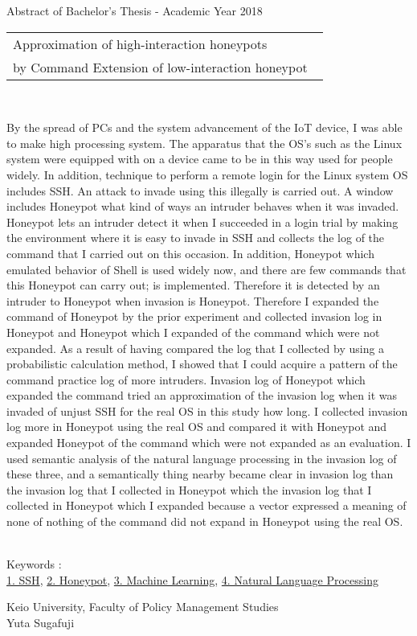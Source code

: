 Abstract of Bachelor's Thesis - Academic Year 2018
\begin{center}
\begin{large}
\begin{tabular}{|p{0.97\linewidth}|}
    \hline
        Approximation of high-interaction honeypots\\
by Command Extension of low-interaction honeypot\\
    \hline
\end{tabular}
\end{large}
\end{center}

~ \\
\renewcommand{\baselinestretch}{0.9}

By the spread of PCs and the system advancement of the IoT device, I was able to make high processing system. The apparatus that the OS's such as the Linux system were equipped with on a device came to be in this way used for people widely. In addition, technique to perform a remote login for the Linux system OS includes SSH. An attack to invade using this illegally is carried out.
A window includes Honeypot what kind of ways an intruder behaves when it was invaded. Honeypot lets an intruder detect it when I succeeded in a login trial by making the environment where it is easy to invade in SSH and collects the log of the command that I carried out on this occasion. In addition, Honeypot which emulated behavior of Shell is used widely now, and there are few commands that this Honeypot can carry out; is implemented. Therefore it is detected by an intruder to Honeypot when invasion is Honeypot. Therefore I expanded the command of Honeypot by the prior experiment and collected invasion log in Honeypot and Honeypot which I expanded of the command which were not expanded. As a result of having compared the log that I collected by using a probabilistic calculation method, I showed that I could acquire a pattern of the command practice log of more intruders. Invasion log of Honeypot which expanded the command tried an approximation of the invasion log when it was invaded of unjust SSH for the real OS in this study how long. I collected invasion log more in Honeypot using the real OS and compared it with Honeypot and expanded Honeypot of the command which were not expanded as an evaluation. I used semantic analysis of the natural language processing in the invasion log of these three, and a semantically thing nearby became clear in invasion log than the invasion log that I collected in Honeypot which the invasion log that I collected in Honeypot which I expanded because a vector expressed a meaning of none of nothing of the command did not expand in Honeypot using the real OS.

\renewcommand{\baselinestretch}{1.0}

~ \\
Keywords : \\
\underline{1. SSH},
\underline{2. Honeypot},
\underline{3. Machine Learning},
\underline{4. Natural Language Processing}
\begin{flushright}
Keio University, Faculty of Policy Management Studies\\
Yuta Sugafuji
\end{flushright}

